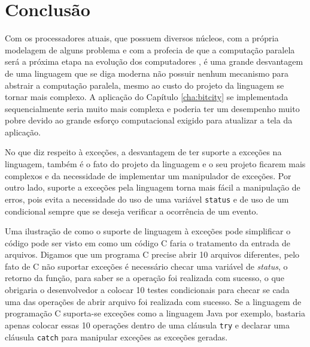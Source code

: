 \chapter{Conclusão}
\label{cha:conclusao}

Com os processadores atuais, que possuem diversos núcleos, com a própria
modelagem de alguns problema e com a profecia de que a computação paralela
será a próxima etapa na evolução dos computadores \cite{TM}, é uma grande
desvantagem de uma linguagem que se diga moderna não possuir nenhum
mecanismo para abstrair a computação paralela, mesmo ao custo do projeto da
linguagem se tornar mais complexo. A aplicação do Capítulo
\ref{cha:bitcity} se implementada sequencialmente seria muito mais
complexa e poderia ter um desempenho muito pobre devido ao grande esforço
computacional exigido para atualizar a tela da aplicação.

No que diz respeito à exceções, a desvantagem de ter suporte a
exceções na linguagem, também é o fato do projeto da linguagem e o seu projeto
ficarem mais complexos e da necessidade de implementar um manipulador
de exceções. Por outro lado, suporte a exceções pela linguagem torna
mais fácil a manipulação de erros, pois evita a necessidade do uso de
uma variável \texttt{status} e de uso de um condicional sempre que se
deseja verificar a ocorrência de um evento.

Uma ilustração de como o suporte de linguagem à exceções pode simplificar
o código pode ser visto em como um código C faria o tratamento da entrada de
arquivos. Digamos que um programa C precise abrir 10 arquivos diferentes, pelo
fato de C não suportar exceções é necessário checar uma variável de {\it
status}, o retorno da função, para saber se a operação foi realizada com
sucesso, o que obrigaria o desenvolvedor a colocar 10 testes condicionais para
checar se cada uma das operações de abrir arquivo foi realizada com
sucesso. Se a linguagem de programação C suporta-se exceções como a
linguagem Java por exemplo, bastaria apenas colocar essas 10 operações
dentro de uma cláusula \texttt{try} e declarar uma cláusula \texttt{catch}
para manipular exceções as exceções geradas.
